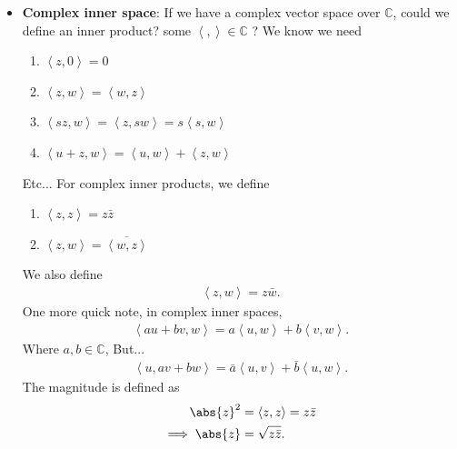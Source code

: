 \documentclass{report}
\begin{document}
\begin{itemize}
        \item \textbf{Complex inner space}: If we have a complex vector space over $\mathbb{C}$, could we define an inner product? some $\left\langle  , \right\rangle \in \mathbb{C}$ ? We know we need
            \begin{enumerate}
                \item $\left\langle z,0 \right\rangle = 0$
                \item $\left\langle z,w \right\rangle = \left\langle w,z \right\rangle$
                \item $\left\langle sz,w \right\rangle  =\left\langle z,sw \right\rangle = s\left\langle s,w \right\rangle$
                \item $\left\langle u+z,w \right\rangle  = \left\langle u,w  \right\rangle + \left\langle z,w \right\rangle$ 
            \end{enumerate}
            Etc... For complex inner products, we define
            \begin{enumerate}
                \item $\left\langle z,z \right\rangle = z\bar{z}$
                \item $\left\langle z,w \right\rangle = \overline{\left\langle w,z \right\rangle}$
            \end{enumerate}
            We also define 
            \begin{align*}
                \left\langle z,w \right\rangle = z\bar{w}
            .\end{align*}
            \bigbreak \noindent 
            One more quick note, in complex inner spaces,
            \begin{align*}
                \left\langle au + bv, w \right\rangle = a\left\langle u,w \right\rangle + b \left\langle v,w \right\rangle
            .\end{align*}
            Where $a,b\in\mathbb{C}$, But...
            \begin{align*}
                \left\langle u, av + bw \right\rangle    = \bar{a}\left\langle u,v \right\rangle + \bar{b}\left\langle u,w \right\rangle
            .\end{align*}
            \bigbreak \noindent 
            The magnitude is defined as
            \begin{align*}
                \abs{z}^{2} &= \left\langle z,z \right\rangle = z\bar{z}  \\
                \implies \abs{z} &= \sqrt{z\bar{z}}
            .\end{align*}

\end{itemize}
\end{document}
